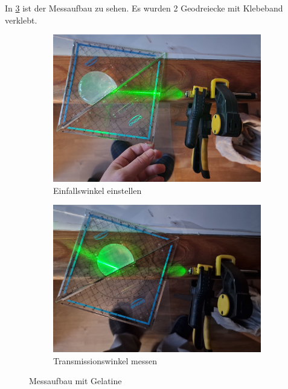\documentclass[colorlinks = true, allcolors = black, ngerman, 11pt,
a4paper, twoside, titlepage]{article}
\numberwithin{figure}{section}
\begin{document}
	In \cref{figs:messaufbau-gelatine} ist der Messaufbau zu sehen. Es
	wurden 2 Geodreiecke mit Klebeband verklebt.
	\begin{figure}[h]
		\centering
		\begin{subfigure}{0.4\textwidth}
			\centering
			\includegraphics[height=0.7\linewidth]{imgs/winkel_einstellen_gelatine}
			\caption{Einfallswinkel einstellen}
			\label{fig:winkeleinstellengelatine}
		\end{subfigure}
		\hfil
		\begin{subfigure}{0.4\textwidth}
			\centering
			\includegraphics[height=0.7\linewidth]{imgs/winkel_messen_gelatine}
			\caption{Transmissionswinkel messen}
			\label{fig:winkelmessengelatine}
		\end{subfigure}
		\caption{Messaufbau mit Gelatine}
		\label{figs:messaufbau-gelatine}
	\end{figure}
	
\end{document}
